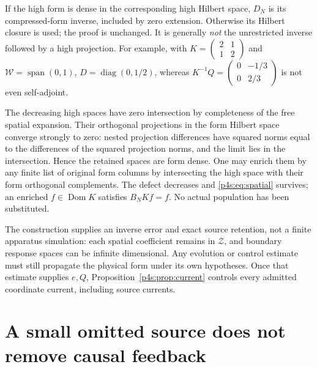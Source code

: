 \documentclass[11pt]{article}
\numberwithin{equation}{section}
\theoremstyle{definition}
\theoremstyle{remark}
\begin{document}
If the high form is dense in the corresponding high Hilbert space,
$D_N$ is its compressed-form inverse, included by zero extension.
Otherwise its Hilbert closure is used; the proof is unchanged.
It is generally \emph{not} the unrestricted inverse followed by a high
projection. For example, with
$K=\left(\begin{smallmatrix}2&1\\1&2\end{smallmatrix}\right)$ and
$\mathcal W=\operatorname{span}(0,1)$,
$D=\operatorname{diag}(0,1/2)$, whereas
$K^{-1}Q=\left(\begin{smallmatrix}0&-1/3\\0&2/3\end{smallmatrix}\right)$
is not even self-adjoint.

The decreasing high spaces have zero intersection by completeness of
the free spatial expansion. Their orthogonal projections in the form
Hilbert space converge strongly to zero: nested projection differences
have squared norms equal to the differences of the squared projection
norms, and the limit lies in the intersection. Hence the retained
spaces are form dense. One may enrich them by any finite list of
original form columns by intersecting the high space with their form
orthogonal complements. The defect decreases and
\eqref{p4s:eq:spatial} survives; an enriched $f\in\operatorname{Dom}K$
satisfies $B_NKf=f$. No actual population has been substituted.

The construction supplies an inverse error and exact source retention,
not a finite apparatus simulation: each spatial coefficient remains in
$\mathcal Z$, and boundary response spaces can be infinite dimensional.
Any evolution or control estimate must still propagate the physical
form under its own hypotheses. Once that estimate supplies $e,Q$,
Proposition~\ref{p4s:prop:current} controls every admitted coordinate
current, including source currents.

\section{A small omitted source does not remove causal feedback}
\label{p4s:sec:feedback}
\end{document}
